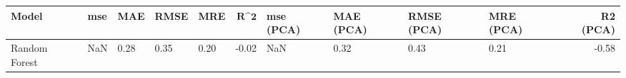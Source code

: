 \begin{table}
\centering
\label{table:iri_reg_pred}
\begin{tabular}{lllllrllllr}
\toprule
\textbf{Model} & \textbf{mse} & \textbf{MAE} & \textbf{RMSE} & \textbf{MRE} & $\textbf{R^2}$ & \textbf{mse (PCA)} & \textbf{MAE (PCA)} & \textbf{RMSE (PCA)} & \textbf{MRE (PCA)} & \textbf{R2 (PCA)} \\
\midrule
 Random Forest &          NaN &         0.28 &          0.35 &         0.20 &          -0.02 &                NaN &               0.32 &                0.43 &               0.21 &             -0.58 \\
\bottomrule
\end{tabular}
\end{table}
